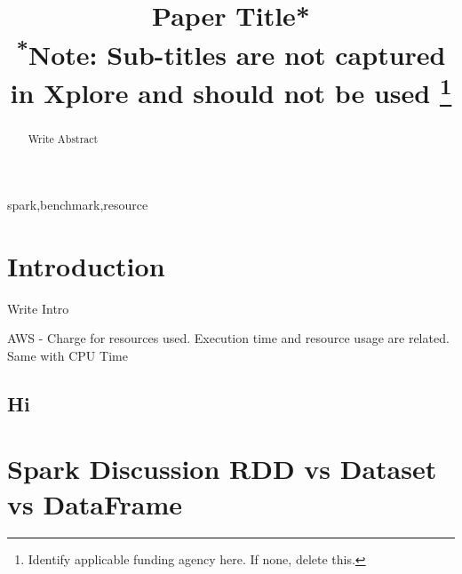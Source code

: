 \documentclass[conference]{IEEEtran}
\begin{document}
\title{Paper Title*\\
{\footnotesize \textsuperscript{*}Note: Sub-titles are not captured in Xplore and
should not be used}
\thanks{Identify applicable funding agency here. If none, delete this.}
}

\author{
\and
{}
\and
{}
}

\maketitle

\begin{abstract}
Write Abstract
\end{abstract}

\begin{IEEEkeywords}
spark,benchmark,resource
\end{IEEEkeywords}

\section{Introduction}
Write Intro

AWS - Charge for resources used.  Execution time and resource usage are related.  Same with CPU Time

\subsection{Hi}

\section{Spark Discussion RDD vs Dataset vs DataFrame}
\end{document}
